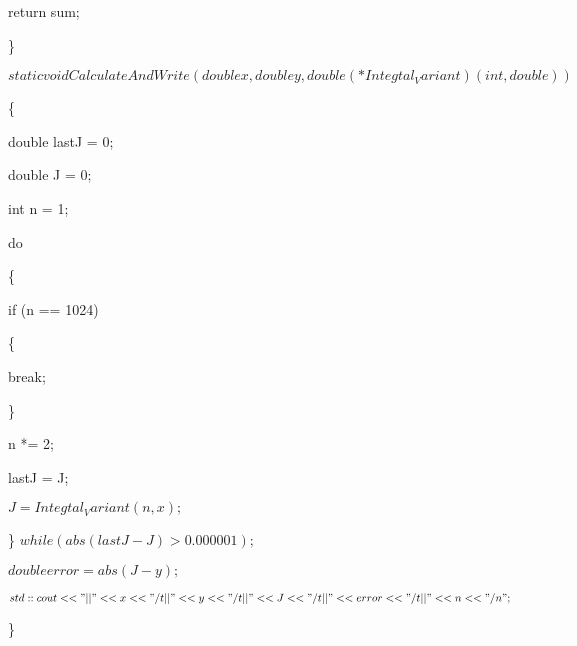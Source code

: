 \documentclass[12pt,a4paper]{report}
\begin{document}
		\hspace{1cm}return sum;
	
	\}
	
	$static void CalculateAndWrite(double x, double y, double (*Integtal_Variant)(int, double))$
	
	\{
	
		\hspace{1cm}double lastJ = 0;
	
		\hspace{1cm}double J = 0;
	
		\hspace{1cm}int n = 1;
	
		\hspace{1cm}do
	
		\hspace{1cm}\{
	
			\hspace{2cm}if (n == 1024) 
	
			\hspace{2cm}\{
	
				\hspace{3cm}break;
	
			\hspace{2cm}\}
	
			\hspace{2cm}n *= 2;
	
			\hspace{2cm}lastJ = J;
	
			\hspace{2cm}$J = Integtal_Variant(n, x);$
	
		\hspace{1cm}\} $while (abs(lastJ - J) > 0.000001);$
	
		\hspace{1cm}$double error = abs(J - y);$
	
		\hspace{1cm}$std::cout << "|| " << x << " \slash t|| " << y << " \slash t|| " << J << " \slash t|| " << error << " \slash t|| " << n << "\slash n";$
	
	\}
\end{document}

